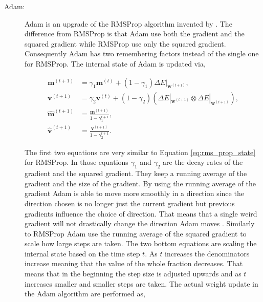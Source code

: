 \begin{description}
    \item[\gls{Adam}:]

        \gls{Adam} is an upgrade of the \gls{RMSProp} algorithm invented by
        \citet{DBLP:journals/corr/KingmaB14}. The difference from \gls{RMSProp}
        is that \gls{Adam} use both the gradient and the squared gradient while
        \gls{RMSProp} use only the squared gradient. Consequently \gls{Adam} has
        two remembering factors instead of the single one for \gls{RMSProp}. The
        internal state of \gls{Adam} is updated via,

        \begin{align}
            \mathbf{m}^{(t+1)} &=
                \gamma_1\mathbf{m}^{(t)} +
                (1 - \gamma_1) \Delta E|_{\mathbf{w}^{(t+1)}}, \\
            \mathbf{v}^{(t+1)} &=
                \gamma_2\mathbf{v}^{(t)} +
                (1 - \gamma_2) \left(
                    \Delta E|_{\mathbf{w}^{(t+1)}} \otimes \Delta E|_{\mathbf{w}^{(t+1)}}
                \right), \\
            \mathbf{\hat{m}}^{(t+1)} &=
                \frac{\mathbf{m}^{(t+1)}}{1 - \gamma_1^{t + 1}}, \\
            \mathbf{\hat{v}}^{(t+1)} &=
                \frac{\mathbf{v}^{(t+1)}}{1 - \gamma_2^{t + 1}}.
        \end{align}

        The first two equations are very similar to Equation
        \eqref{eq:rms_prop_state} for \gls{RMSProp}. In those equations
        $\gamma_1$ and $\gamma_2$ are the decay rates of the gradient and the
        squared gradient. They keep a running average of the gradient and the
        size of the gradient. By using the running average of the gradient
        \gls{Adam} is able to move more smoothly in a direction since the
        direction chosen is no longer just the current gradient but previous
        gradients influence the choice of direction. That means that a single
        weird gradient will not drastically change the direction \gls{Adam}
        moves \citep{DBLP:journals/corr/KingmaB14}. Similarly to \gls{RMSProp}
        \gls{Adam} use the running average of the squared gradient to scale how
        large steps are taken. The two bottom equations are scaling the internal
        state based on the time step $t$. As $t$ increases the denominators
        increase meaning that the value of the whole fraction decreases. That
        means that in the beginning the step size is adjusted upwards and as $t$
        increases smaller and smaller steps are taken. The actual weight update
        in the \gls{Adam} algorithm are performed as,


\end{description}
